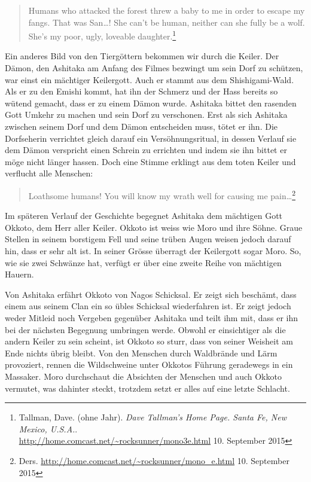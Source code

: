 \begin{quote}
\glqq Humans who attacked the forest threw a baby to me in order to escape my fangs. That was San\dots! She can't be human, neither can she fully be a wolf. She's my poor, ugly, loveable daughter.\grqq \footnote{Tallman, Dave. (ohne Jahr). \emph{Dave Tallman's Home Page. Santa Fe, New Mexico, U.S.A.}.\\ \url{http://home.comcast.net/~rocksunner/mono3e.html} 10. September 2015}
\end{quote}

Ein anderes Bild von den Tiergöttern bekommen wir durch die Keiler. Der Dämon, den Ashitaka am Anfang des Filmes bezwingt um sein Dorf zu schützen, war einst ein mächtiger Keilergott. Auch er stammt aus dem Shishigami-Wald. Als er zu den Emishi kommt, hat ihn der Schmerz und der Hass bereits so wütend gemacht, dass er zu einem Dämon wurde. Ashitaka bittet den rasenden Gott Umkehr zu machen und sein Dorf zu verschonen. Erst als sich Ashitaka zwischen seinem Dorf und dem Dämon entscheiden muss, tötet er ihn. Die Dorfseherin verrichtet gleich darauf ein Versöhnungsritual, in dessen Verlauf sie dem Dämon verspricht einen Schrein zu errichten und indem sie ihn bittet er möge nicht länger hassen. Doch eine Stimme erklingt aus dem toten Keiler und verflucht alle Menschen: 

\begin{quote}
\glqq Loathsome humans! You will know my wrath well for causing me pain\dots \grqq \footnote{Ders. \url{http://home.comcast.net/~rocksunner/mono_e.html} 10. September 2015}
\end{quote} 

Im späteren Verlauf der Geschichte begegnet Ashitaka dem mächtigen Gott Okkoto, dem Herr aller Keiler. Okkoto ist weiss wie Moro und ihre Söhne. Graue Stellen in seinem borstigem Fell und seine trüben Augen weisen jedoch darauf hin, dass er sehr alt ist. In seiner Grösse überragt der Keilergott sogar Moro. So, wie sie zwei Schwänze hat, verfügt er über eine zweite Reihe von mächtigen Hauern.  

Von Ashitaka erfährt Okkoto von Nagos Schicksal. Er zeigt sich beschämt, dass einem aus seinem Clan ein so übles Schicksal wiederfahren ist. Er zeigt jedoch weder Mitleid noch Vergeben gegenüber Ashitaka und teilt ihm mit, dass er ihn bei der nächsten Begegnung umbringen werde. Obwohl er einsichtiger als die andern Keiler zu sein scheint, ist Okkoto so sturr, dass von seiner Weisheit am Ende nichts übrig bleibt. Von den Menschen durch Waldbrände und Lärm provoziert, rennen die Wildschweine unter Okkotos Führung geradewegs in ein Massaker. Moro durchschaut die Absichten der Menschen und auch Okkoto vermutet, was dahinter steckt, trotzdem setzt er alles auf eine letzte Schlacht.  

